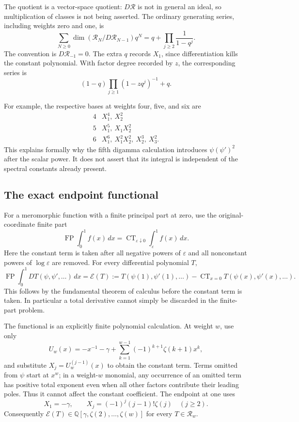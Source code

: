 The quotient is a vector-space quotient: $D\mathscr R$ is not in
general an ideal, so multiplication of classes is not being asserted.
The ordinary generating series, including weights zero and one, is
\begin{equation}\label{dq:Hilbert}
 \sum_{N\ge0}\dim(\mathscr R_N/D\mathscr R_{N-1})q^N
 =q+\prod_{j\ge2}\frac1{1-q^j}.
\end{equation}
The convention is $D\mathscr R_{-1}=0$. The extra $q$ records
$X_1$, since differentiation kills the constant polynomial.
With factor degree recorded by $z$, the corresponding series is
\[
 (1-q)\prod_{j\ge1}(1-zq^j)^{-1}+q.
\]

For example, the respective bases at weights four, five, and six are
\[
 \begin{array}{c|l}
 4& X_1^4,\ X_2^2\\
 5& X_1^5,\ X_1X_2^2\\
 6& X_1^6,\ X_1^2X_2^2,\ X_2^3,\ X_3^2.
 \end{array}
\]
This explains formally why the fifth digamma calculation introduces
$\psi(\psi')^2$ after the scalar power. It does not assert that its
integral is independent of the spectral constants already present.

\subsection{The exact endpoint functional}

For a meromorphic function with a finite principal part at zero, use
the original-coordinate finite part
\[
 \operatorname{FP}\int_0^1f(x)\,dx
 =\operatorname{CT}_{\varepsilon\downarrow0}\int_\varepsilon^1 f(x)\,dx.
\]
Here the constant term is taken after all negative powers of
$\varepsilon$ and all nonconstant powers of $\log\varepsilon$ are removed.
For every differential polynomial $T$,
\begin{equation}\label{dq:endpointfunctional}
 \operatorname{FP}\int_0^1 DT(\psi,\psi',\ldots)\,dx
 =\mathcal E(T):=T(\psi(1),\psi'(1),\ldots)
          -\operatorname{CT}_{x=0}T(\psi(x),\psi'(x),\ldots).
\end{equation}
This follows by the fundamental theorem of calculus before the constant
term is taken. In particular a total derivative cannot simply be
discarded in the finite-part problem.

The functional is an explicitly finite polynomial calculation. At
weight $w$, use only
\begin{equation}\label{dq:endpointtruncation}
 U_w(x)=-x^{-1}-\gamma+
       \sum_{k=1}^{w-1}(-1)^{k+1}\zeta(k+1)x^k,
\end{equation}
and substitute $X_j=U_w^{(j-1)}(x)$ to obtain the constant term.
Terms omitted from $\psi$ start at $x^w$; in a weight-$w$ monomial,
any occurrence of an omitted term has positive total exponent even
when all other factors contribute their leading poles. Thus it cannot
affect the constant coefficient. The endpoint at one uses
\[
 X_1=-\gamma,\qquad X_j=(-1)^j(j-1)!\zeta(j)\quad(j\ge2).
\]
Consequently $\mathcal E(T)\in\mathbb Q[\gamma,\zeta(2),\ldots,\zeta(w)]$
for every $T\in\mathscr R_w$.

